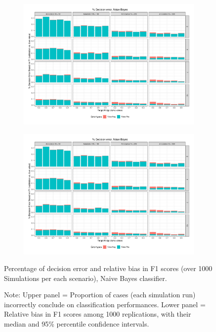 \documentclass[man, 12pt, a4paper, nolmodern, noextraspace]{apa6}
\begin{document}
\begin{figure}
    \centering
    \begin{subfigure}[t]{0.95\textwidth}
        \centering
        \includegraphics[clip, width=\linewidth, page = 1]{Results/BAYES_summary_05.pdf} 
    \end{subfigure}
    \begin{subfigure}[t]{0.95\textwidth}
        \centering
        \captionsetup{font=small}
        \includegraphics[clip, width=\linewidth, page = 2]{Results/BAYES_summary_05.pdf} 
    \end{subfigure}
    
    \captionsetup{format=hang}
    \caption{Percentage of decision error and relative bias in F1 scores (over 1000 Simulations per each scenario), Naive Bayes classifier.} 
    \label{fig:Figure2}
    \captionsetup{font=small}
    \caption*{Note: Upper panel = Proportion of cases (each simulation run) incorrectly conclude on classification performances. Lower panel = Relative bias in F1 scores among 1000 replications, with their median and 95\% percentile confidence intervals.}
\end{figure}          
\end{document}
